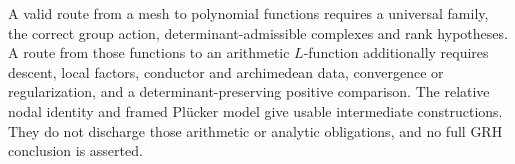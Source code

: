 A valid route from a mesh to polynomial functions requires a universal
family, the correct group action, determinant-admissible complexes and
rank hypotheses. A route from those functions to an arithmetic $L$-function
additionally requires descent, local factors, conductor and archimedean data,
convergence or regularization, and a determinant-preserving positive comparison.
The relative nodal identity and framed Pl\"ucker model give usable intermediate
constructions. They do not discharge those arithmetic or analytic obligations,
and no full GRH conclusion is asserted.
